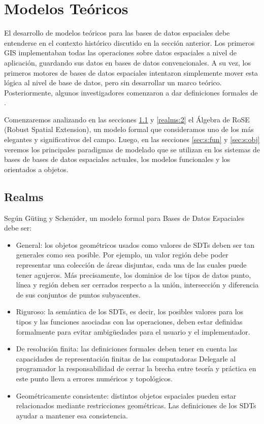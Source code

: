\section{Modelos Teóricos} \label{sec:s:models}

El desarrollo de modelos teóricos para las bases de datos espaciales debe entenderse en el contexto histórico discutido en la sección anterior.
Los primeros GIS implementaban todas las operaciones sobre datos espaciales a nivel de aplicación, guardando sus datos en bases de datos convencionales.
A su vez, los primeros motores de bases de datos espaciales intentaron simplemente mover esta lógica al nivel de base de datos, pero sin desarrollar un marco teórico.
Posteriormente, algunos investigadores comenzaron a dar definiciones formales de .

Comenzaremos analizando en las secciones \ref{realms:1} y \ref{realms:2} el Álgebra de RoSE\textsuperscript{\cite{rose}} (Robust Spatial Extension), un modelo formal que consideramos uno de los más elegantes y significativos del campo.
Luego, en las secciones \ref{sec:s:fun} y \ref{sec:s:obj} veremos los principales paradigmas de modelado que se utilizan en los sistemas de bases de bases de datos espaciales actuales, los modelos funcionales y los orientados a objetos.

\subsection{Realms} \label{realms:1}

Según Güting y Schenider\textsuperscript{\cite{rose}}, un modelo formal para Bases de Datos Espaciales debe ser:
\begin{itemize}
    \item General: los objetos geométricos usados como valores de SDTs deben ser tan generales como sea posible.
        Por ejemplo, un valor región debe poder representar una colección de áreas disjuntas, cada una de las cuales puede tener agujeros.
        Más precisamente, los dominios de los tipos de datos punto, línea y región deben ser cerrados respecto a la unión,
        intersección y diferencia de sus conjuntos de puntos subyacentes.
    \item Riguroso: la semántica de los SDTs, es decir, los posibles valores para los tipos y las funciones asociadas con las operaciones,
        deben estar definidas formalmente para evitar ambigüedades para el usuario y el implementador.
    \item De resolución finita: las definiciones formales deben tener en cuenta las capacidades de representación finitas de las computadoras
        Delegarle al programador la responsabilidad de cerrar la brecha entre teoría y práctica en este punto lleva a errores numéricos y topológicos.
    \item Geométricamente consistente: distintos objetos espaciales pueden estar relacionados mediante restricciones geométricas.
        Las definiciones de los SDTs ayudar a mantener esa consistencia.
\end{itemize}

